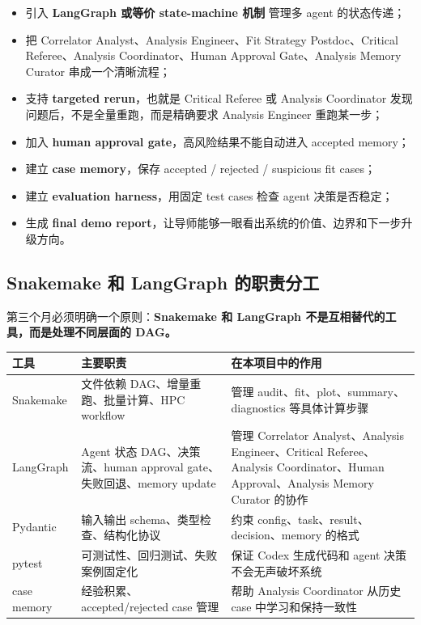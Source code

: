 \documentclass[11pt,a4paper,fontset=none]{ctexart}
\begin{document}
\begin{itemize}[leftmargin=2em]
  \item 引入 \textbf{LangGraph 或等价 state-machine 机制} 管理多 agent 的状态传递；
  \item 把 Correlator Analyst、Analysis Engineer、Fit Strategy Postdoc、Critical Referee、Analysis Coordinator、Human Approval Gate、Analysis Memory Curator 串成一个清晰流程；
  \item 支持 \textbf{targeted rerun}，也就是 Critical Referee 或 Analysis Coordinator 发现问题后，不是全量重跑，而是精确要求 Analysis Engineer 重跑某一步；
  \item 加入 \textbf{human approval gate}，高风险结果不能自动进入 accepted memory；
  \item 建立 \textbf{case memory}，保存 accepted / rejected / suspicious fit cases；
  \item 建立 \textbf{evaluation harness}，用固定 test cases 检查 agent 决策是否稳定；
  \item 生成 \textbf{final demo report}，让导师能够一眼看出系统的价值、边界和下一步升级方向。
\end{itemize}

\subsection{Snakemake 和 LangGraph 的职责分工}

第三个月必须明确一个原则：\textbf{Snakemake 和 LangGraph 不是互相替代的工具，而是处理不同层面的 DAG。}

\begin{longtable}{p{}p{}p{}}
\toprule
工具 & 主要职责 & 在本项目中的作用 \\
\midrule
Snakemake & 文件依赖 DAG、增量重跑、批量计算、HPC workflow & 管理 audit、fit、plot、summary、diagnostics 等具体计算步骤 \\
LangGraph & Agent 状态 DAG、决策流、human approval gate、失败回退、memory update & 管理 Correlator Analyst、Analysis Engineer、Critical Referee、Analysis Coordinator、Human Approval、Analysis Memory Curator 的协作 \\
Pydantic & 输入输出 schema、类型检查、结构化协议 & 约束 config、task、result、decision、memory 的格式 \\
pytest & 可测试性、回归测试、失败案例固定化 & 保证 Codex 生成代码和 agent 决策不会无声破坏系统 \\
case memory & 经验积累、accepted/rejected case 管理 & 帮助 Analysis Coordinator 从历史 case 中学习和保持一致性 \\
\bottomrule
\end{longtable}
\end{document}
